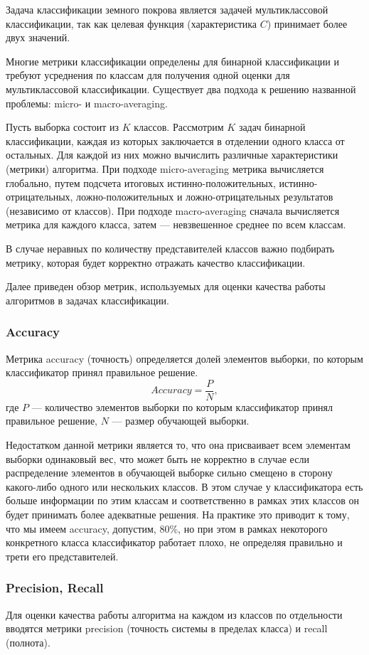 \documentclass[14pt, a4paper, oneside]{extarticle}
\begin{document}
Задача классификации земного покрова является задачей мультиклассовой классификации, так как целевая функция (характеристика $C$) принимает более двух значений.

Многие метрики классификации определены для бинарной классификации и требуют усреднения по классам для получения одной оценки для мультиклассовой классификации. Существует два подхода к решению названной проблемы: micro- и macro-averaging.

Пусть выборка состоит из $K$ классов. Рассмотрим $K$ задач бинарной классификации, каждая из которых заключается в отделении одного класса от остальных. Для каждой из них можно вычислить различные характеристики (метрики) алгоритма. При подходе micro-averaging метрика вычисляется глобально, путем подсчета итоговых истинно-положительных, истинно-отрицательных, ложно-положительных и ложно-отрицательных результатов (независимо от классов). При подходе macro-averaging сначала вычисляется метрика для каждого класса, затем --- невзвешенное среднее по всем классам.

В случае неравных по количеству представителей классов важно подбирать метрику, которая будет корректно отражать качество классификации.

Далее приведен обзор метрик, используемых для оценки качества работы алгоритмов в задачах классификации.

\subsubsection{Accuracy}
Метрика accuracy (точность) определяется долей элементов выборки, по которым классификатор принял правильное решение.
$$Accuracy = \frac{P}{N},$$
где $P$ --- количество элементов выборки по которым классификатор принял правильное решение, $N$ --- размер обучающей выборки.

Недостатком данной метрики является то, что она присваивает всем элементам выборки одинаковый вес, что может быть не корректно в случае если распределение элементов в обучающей выборке сильно смещено в сторону какого-либо одного или нескольких классов. В этом случае у классификатора есть больше информации по этим классам и соответственно в рамках этих классов он будет принимать более адекватные решения. На практике это приводит к тому, что мы имеем accuracy, допустим, 80\%, но при этом в рамках некоторого конкретного класса классификатор работает плохо, не определяя правильно и трети его представителей.

\subsubsection{Precision, Recall}
Для оценки качества работы алгоритма на каждом из классов по отдельности вводятся метрики precision (точность системы в пределах класса) и recall (полнота).
\end{document}
